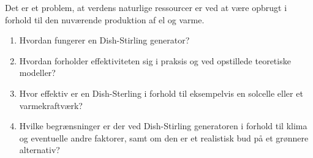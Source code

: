 \documentclass[SRC.tex]{subfiles}
\begin{document}
	Det er et problem, at verdens naturlige ressourcer er ved at være opbrugt i forhold til den nuværende produktion af el og varme.  
	\begin{enumerate}[-]
		\item Hvordan fungerer en Dish-Stirling generator?
		\item Hvordan forholder effektiviteten sig i praksis og ved opstillede teoretiske modeller?
		\item Hvor effektiv er en Dish-Sterling i forhold til eksempelvis en solcelle eller et varmekraftværk?
		\item Hvilke begrænsninger er der ved Dish-Stirling generatoren i forhold til klima og eventuelle andre faktorer, samt om den er et realistisk bud på et grønnere alternativ? 
	\end{enumerate} 
\end{document}
